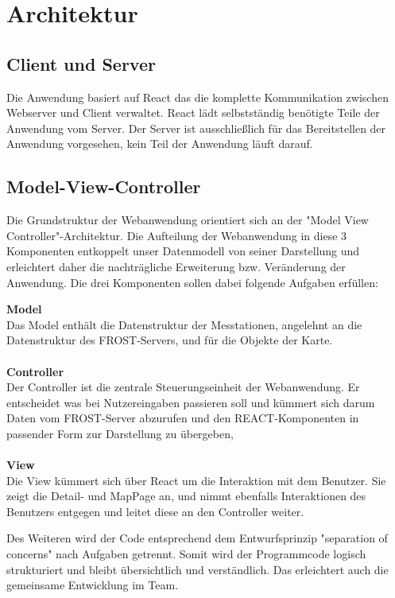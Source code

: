 \section{Architektur}

\subsection{Client und Server}
Die Anwendung basiert auf React das die komplette Kommunikation zwischen Webserver und Client verwaltet.
React lädt selbstständig benötigte Teile der Anwendung vom Server.
Der Server ist ausschließlich für das Bereitstellen der Anwendung vorgesehen, 
kein Teil der Anwendung läuft darauf.

\subsection{Model-View-Controller}
Die Grundstruktur der Webanwendung orientiert sich an der "Model View Controller"-Architektur. 
Die Aufteilung der Webanwendung in diese 3 Komponenten entkoppelt unser Datenmodell von seiner 
Darstellung und erleichtert daher die nachträgliche Erweiterung bzw. Veränderung der Anwendung.
Die drei Komponenten sollen dabei folgende Aufgaben erfüllen:
\begin{addmargin}[25pt]{0pt}
    \textbf{Model}\\
    Das Model enthält die Datenstruktur der Messtationen, angelehnt an die Datenstruktur des 
    \gls{FROST-Server}s, und für die Objekte der Karte.
    \\ \\
    \textbf{Controller}\\
    Der Controller ist die zentrale Steuerungseinheit der Webanwendung. 
    Er entscheidet was bei Nutzereingaben passieren soll und kümmert sich darum Daten 
    vom \gls{FROST-Server} abzurufen und den REACT-Komponenten in passender Form zur 
    Darstellung zu übergeben,
    \\ \\
    \textbf{View}\\
    Die View kümmert sich über \gls{React} um die Interaktion 
    mit dem Benutzer. Sie zeigt die Detail- und MapPage an, und nimmt ebenfalls 
    Interaktionen des Benutzers entgegen und leitet diese an den Controller weiter.
\end{addmargin}

Des Weiteren wird der Code entsprechend dem Entwurfsprinzip "separation of concerns" nach Aufgaben getrennt. 
Somit wird der Programmcode logisch strukturiert und bleibt übersichtlich und verständlich. 
Das erleichtert auch die gemeinsame Entwicklung im Team.

